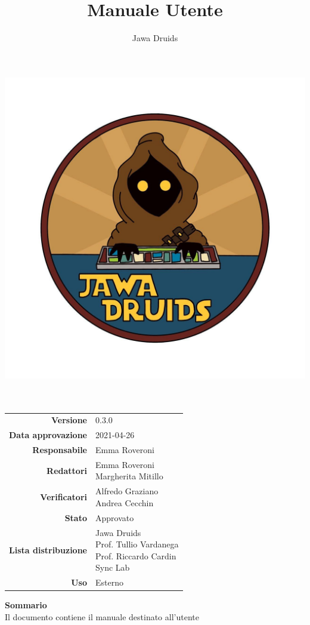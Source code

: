 




	\makeatletter
	\begin{titlepage}
		\begin{center}
			\vspace*{-4cm}
			\author{Jawa Druids}
			\title{Manuale Utente}
			\date{} %
			\includegraphics[width=0.5\linewidth]{../immagini/DRUIDSLOGO.jpg}\\[4ex]
			{\huge \bfseries  \@title }\\[2ex]
			{\LARGE  \@author}\\[50ex]
			\vspace*{-9cm}
			\begin{table}[H]
				\renewcommand{\arraystretch}{1.4}
				\centering
				\begin{tabular}{r | l}
					\textbf{Versione} & 0.3.0 \\%
					\textbf{Data approvazione} & 2021-04-26\\
					\textbf{Responsabile} & Emma Roveroni\\
					\textbf{Redattori} & \makecell[tl]{ Emma Roveroni \\ Margherita Mitillo} \\
					\textbf{Verificatori} & \makecell[tl]{Alfredo Graziano \\ Andrea Cecchin} \\
					\textbf{Stato} & Approvato\\
					\textbf{Lista distribuzione} & \makecell[tl]{Jawa Druids \\ Prof. Tullio Vardanega \\ Prof. Riccardo Cardin \\ Sync Lab}\\
					\textbf{Uso} & Esterno
				\end{tabular}
			\end{table}
			\vspace{0.1cm}
			\hfill \break
			\fontsize{17}{10}\textbf{Sommario} \\
			\vspace{0.1cm}
			Il documento contiene il manuale destinato all'utente
		\end{center}
	\end{titlepage}
	\makeatother

	
	\tableofcontents{}
	\listoffigures

	
	
	
	


